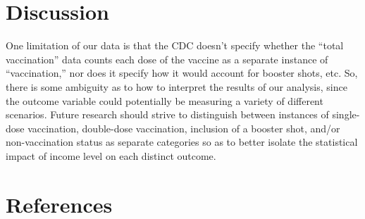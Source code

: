 \documentclass[
]{article}
\begin{document}
\hypertarget{discussion}{%
\section{Discussion}\label{discussion}}

One limitation of our data is that the CDC doesn't specify whether the
``total vaccination'' data counts each dose of the vaccine as a separate
instance of ``vaccination,'' nor does it specify how it would account
for booster shots, etc. So, there is some ambiguity as to how to
interpret the results of our analysis, since the outcome variable could
potentially be measuring a variety of different scenarios. Future
research should strive to distinguish between instances of single-dose
vaccination, double-dose vaccination, inclusion of a booster shot,
and/or non-vaccination status as separate categories so as to better
isolate the statistical impact of income level on each distinct outcome.

\hypertarget{references}{%
\section{References}\label{references}}
\end{document}
